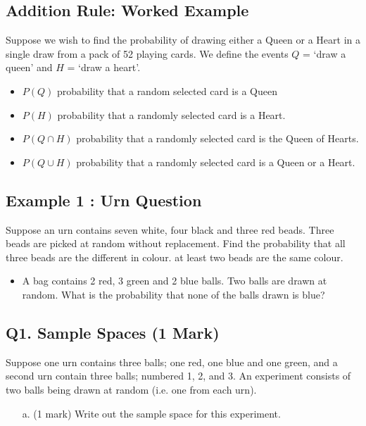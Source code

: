 \documentclass[]{report}
\begin{document}
\subsection{Addition Rule: Worked Example}
Suppose we wish to find the probability of drawing either a Queen or a Heart
in a single draw from a pack of 52 playing cards. We define the events $Q$ =
`draw a queen' and $H$ = `draw a heart'.
\begin{itemize}
	\item $P(Q)$ probability that a random selected card is a Queen
	\item  $P(H)$ probability that a randomly selected card is a Heart.
	\item  $P(Q\cap H)$ probability that a randomly selected card is the Queen of
	Hearts.
	\item  $P(Q\cup H)$ probability that a randomly selected card is a Queen or a Heart.
\end{itemize}

\subsection{Example 1 :  Urn Question}	

Suppose an urn contains seven white, four black and three red beads. Three beads are picked at random without replacement.
Find the probability that all three beads are the different in colour.
at least two beads are the same colour.
\begin{itemize}	
	\item A bag contains 2 red, 3 green and 2 blue balls. Two balls are drawn at random. What is the probability that none of the balls drawn is blue?
	
\end{itemize}
\subsection*{Q1. Sample Spaces (1 Mark)}  %
Suppose one urn contains three balls; one red, one blue and one green, and a second urn contain three balls; numbered 1, 2, and 3. An experiment consists of two balls being drawn at random (i.e. one from each urn).

\begin{itemize}
	\item[a.] (1 mark) Write out the sample space for this experiment.
\end{itemize}
\end{document}
